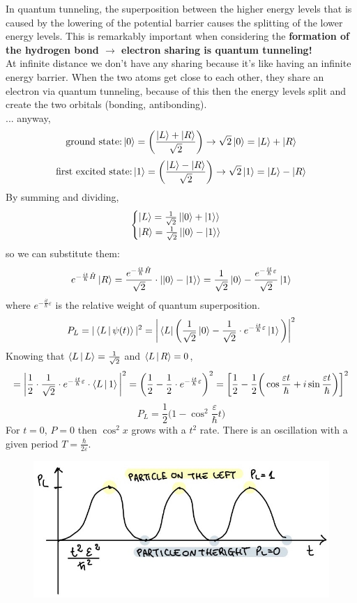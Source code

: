 In quantum tunneling, the superposition between the higher energy levels that is caused by the lowering of the potential barrier causes the splitting of the lower energy levels. This is remarkably important when considering the \textbf{formation of the hydrogen bond $\rightarrow$ electron sharing is quantum tunneling!}\\
At infinite distance we don't have any sharing because it's like having an infinite energy barrier. When the two atoms get close to each other, they share an electron via quantum tunneling, because of this then the energy levels split and create the two orbitals (bonding, antibonding).\\
... anyway,
\[
\text{ground state:} \ket{0}=\bigg(\frac{\ket{L}+\ket{R}}{\sqrt{2}}\bigg) \rightarrow \sqrt{2}\ket{0}= \ket{L}+\ket{R}
\]
\[
\text{first excited state:} \ket{1}=\bigg(\frac{\ket{L}-\ket{R}}{\sqrt{2}}\bigg) \rightarrow \sqrt{2}\ket{1}= \ket{L}-\ket{R}
\]
By summing and dividing,
\[
\begin{cases}
\ket{L}=\frac{1}{\sqrt{2}}\ket{\ket{0}+\ket{1}}\\
\ket{R}=\frac{1}{\sqrt{2}}\ket{\ket{0}-\ket{1}}
\end{cases}
\]
so we can substitute them:
\[
e^{-\frac{it}{\hbar}\hat{H}}\ket{R}=\frac{e^{-\frac{it}{\hbar}\hat{H}}}{\sqrt{2}}\cdot \ket{\ket{0}-\ket{1}}=\frac{1}{\sqrt{2}}\ket{0}-\frac{e^{-\frac{it}{\hbar}\varepsilon}}{\sqrt{2}}\ket{1}
\]
where $e^{-\frac{it}{\hbar}\varepsilon}$ is the relative weight of quantum superposition.\\
\newline
\[
P_L=|\braket{L\,|\,\psi(t)}|^2=\bigg|\bra {L}\bigg(\frac{1}{\sqrt{2}}\ket{0}-\frac{1}{\sqrt{2}}\cdot e^{-\frac{it}{\hbar}\varepsilon} \ket{1} \bigg)\bigg|^2
\]
Knowing that $\braket{L\,|\,L}=\frac{1}{\sqrt{2}}$ and $\braket{L\,|\,R}=0$,
\[
= \bigg|\frac{1}{2}\cdot \frac{1}{\sqrt{2}}\cdot e^{-\frac{it}{\hbar}\varepsilon} \cdot \braket{L\,|\,1}\bigg|^2=\bigg(\frac{1}{2}-\frac{1}{2}\cdot e^{-\frac{it}{\hbar}\varepsilon}\bigg)^2=\bigg[\frac{1}{2}-\frac{1}{2}\bigg(\cos\frac{\varepsilon t}{\hbar}+i\sin\frac{\varepsilon t}{\hbar}\bigg)\bigg]^2
\]
\[
P_L=\frac{1}{2}\bigg(1-\cos^2\frac{\varepsilon}{\hbar}t\bigg)
\]
For $t=0$, $P=0$ then $\cos^2x$ grows with a $t^2$ rate. There is an oscillation with a given period $T=\frac{\hbar}{2\varepsilon}$.\\
\begin{figure}[htbp!]
	\centering
	\includegraphics[scale=0.30]{img_3.jpg}
\end{figure}
\newline
